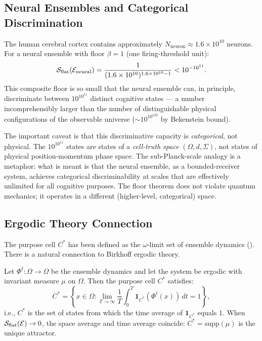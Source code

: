 \subsection{Neural Ensembles and Categorical Discrimination}

\begin{remark}
\label{rem:ch02b-neural-floor}
The human cerebral cortex contains approximately $N_{\mathrm{neuron}} \approx
1.6 \times 10^{10}$ neurons.  For a neural ensemble with floor $\beta = 1$
(one firing-threshold unit):
\[
  \mathcal{S}_{\mathrm{flat}}(\mathcal{E}_{\mathrm{neural}})
  = \frac{1}{(1.6 \times 10^{10})^{1.6 \times 10^{10} - 1}}
  < 10^{-10^{11}}.
\]
This composite floor is so small that the neural ensemble can, in principle,
discriminate between $10^{10^{11}}$ distinct cognitive states — a number
incomprehensibly larger than the number of distinguishable physical
configurations of the observable universe ($\sim 10^{10^{123}}$ by Bekenstein
bound).

The important caveat is that this discriminative capacity is \emph{categorical},
not physical.  The $10^{10^{11}}$ states are states of a \emph{cell-truth
space} $(\Omega, d, \Sigma)$, not states of physical position-momentum phase
space.  The sub-Planck-scale analogy is a metaphor: what is meant is that
the neural ensemble, as a bounded-receiver system, achieves categorical
discriminability at scales that are effectively unlimited for all cognitive
purposes.  The floor theorem does not violate quantum mechanics; it operates
in a different (higher-level, categorical) space.
\end{remark}

\subsection{Ergodic Theory Connection}

The purpose cell $C^*$ has been defined as the $\omega$-limit set of ensemble
dynamics ().  There is a natural connection to
Birkhoff ergodic theory.

\begin{theorem}
\label{thm:ch02b-birkhoff}
Let $\Phi^t : \Omega \to \Omega$ be the ensemble dynamics and let the
system be ergodic with invariant measure $\mu$ on $\Omega$.  Then the
purpose cell $C^*$ satisfies:
\begin{equation}
  C^* = \left\{x \in \Omega : \lim_{T \to \infty} \frac{1}{T} \int_0^T
  \mathbf{1}_{C^*}(\Phi^t(x))\, dt = 1 \right\},
  \label{eq:ch02b-birkhoff}
\end{equation}
i.e., $C^*$ is the set of states from which the time average of
$\mathbf{1}_{C^*}$ equals $1$.  When $\mathcal{S}_{\mathrm{flat}}(\mathcal{E})
\to 0$, the space average and time average coincide:
$C^* = \mathrm{supp}(\mu)$ is the unique attractor.
\end{theorem}

